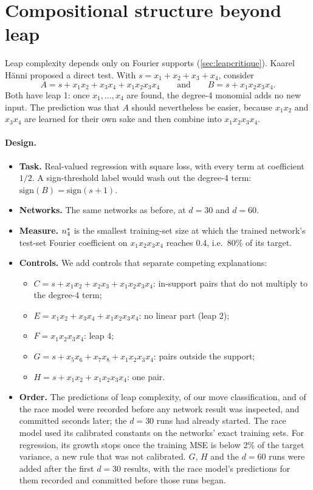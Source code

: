 \section{Compositional structure beyond leap}\label{sec:composition}

Leap complexity depends only on Fourier supports (\cref{sec:leapcritique}). Kaarel H\"anni proposed a direct test. With $s=x_1+x_2+x_3+x_4$, consider
\[
A=s+x_1x_2+x_3x_4+x_1x_2x_3x_4\qquad\text{and}\qquad B=s+x_1x_2x_3x_4 .
\]
Both have leap 1: once $x_1,\dots,x_4$ are found, the degree-4 monomial adds no new input. The prediction was that $A$ should nevertheless be easier, because $x_1x_2$ and $x_3x_4$ are learned for their own sake and then combine into $x_1x_2x_3x_4$.

\paragraph{Design.}
\begin{itemize}
\item \textbf{Task.} Real-valued regression with square loss, with every term at coefficient $1/2$. A sign-threshold label would wash out the degree-4 term: $\mathrm{sign}(B)=\mathrm{sign}(s+1)$.
\item \textbf{Networks.} The same networks as before, at $d=30$ and $d=60$.
\item \textbf{Measure.} $n^{*}_4$ is the smallest training-set size at which the trained network's test-set Fourier coefficient on $x_1x_2x_3x_4$ reaches 0.4, i.e.\ 80\% of its target.
\item \textbf{Controls.} We add controls that separate competing explanations:
  \begin{itemize}
  \item $C=s+x_1x_2+x_2x_3+x_1x_2x_3x_4$: in-support pairs that do not multiply to the degree-4 term;
  \item $E=x_1x_2+x_3x_4+x_1x_2x_3x_4$: no linear part (leap 2);
  \item $F=x_1x_2x_3x_4$: leap 4;
  \item $G=s+x_5x_6+x_7x_8+x_1x_2x_3x_4$: pairs outside the support;
  \item $H=s+x_1x_2+x_1x_2x_3x_4$: one pair.
  \end{itemize}
\item \textbf{Order.} The predictions of leap complexity, of our move classification, and of the race model were recorded before any network result was inspected, and committed seconds later; the $d=30$ runs had already started. The race model used its calibrated constants on the networks' exact training sets. For regression, its growth stops once the training MSE is below 2\% of the target variance, a new rule that was not calibrated. $G$, $H$ and the $d=60$ runs were added after the first $d=30$ results, with the race model's predictions for them recorded and committed before those runs began.
\end{itemize}

